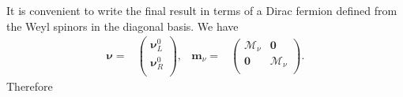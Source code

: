 It is convenient to write the final result in terms of a Dirac fermion defined from the Weyl spinors in the diagonal basis. We have
\begin{align}
  \boldsymbol{\nu}=&
  \begin{pmatrix}
    \boldsymbol{\nu}_L^0\\
    \boldsymbol{\nu}_R^0\\
  \end{pmatrix},&       \boldsymbol{m}_{\nu}=& \begin{pmatrix}
                                      \boldsymbol{\mathcal{M}}_{\nu} & \boldsymbol{0} \\
                                      \boldsymbol{0} & \boldsymbol{\mathcal{M}}_{\nu}  \\
                                    \end{pmatrix}.
\end{align}
Therefore
